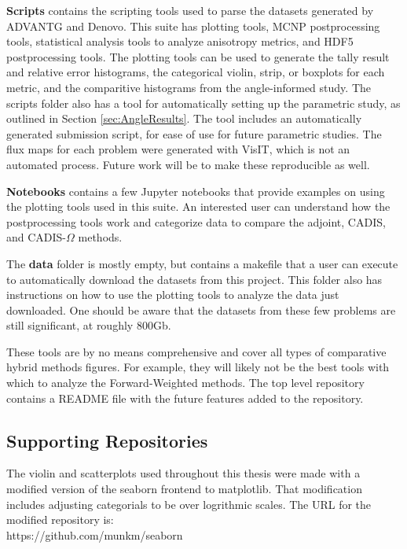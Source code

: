 \textbf{Scripts} contains the scripting tools used to parse the datasets generated by
ADVANTG and Denovo. This suite has plotting tools, MCNP postprocessing tools,
statistical analysis tools to analyze anisotropy metrics, and HDF5
postprocessing tools. The plotting tools can be used to generate the tally
result and relative error histograms, the categorical violin, strip, or boxplots
for each metric, and the comparitive histograms from the angle-informed study.
The scripts folder also has a tool for automatically setting up the parametric
study, as outlined in Section \ref{sec:AngleResults}. The tool includes an
automatically generated submission script, for ease of use for future parametric
studies.
The flux maps for each problem were generated with VisIT, which is not an
automated process. Future work will be to make these reproducible as well.

\textbf{Notebooks} contains a few Jupyter notebooks that provide examples on using the
plotting tools used in this suite. An interested user can understand how the
postprocessing tools work and categorize data to compare the adjoint, CADIS, and
CADIS-$\Omega$ methods.

The \textbf{data} folder is mostly empty, but contains a makefile that a user can execute
to automatically download the datasets from this project. This folder also has
instructions on how to use the plotting tools to analyze the data just
downloaded. One should be aware that the datasets from these few problems are
still significant, at roughly 800Gb.

These tools are by no means comprehensive and cover all types of comparative
hybrid methods figures. For example, they will likely not be the best tools with
which to analyze the Forward-Weighted methods. The
top level repository contains a README file with the future features added
to the repository.

\subsection{Supporting Repositories}
\label{subsec:supportinrepos}

The violin and scatterplots used throughout this thesis were made with a
modified version of the seaborn frontend to matplotlib. That modification
includes adjusting categorials to be over logrithmic scales. The URL for the
modified repository is: \\
https://github.com/munkm/seaborn

